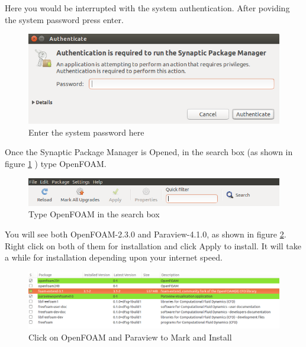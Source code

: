 \documentclass[a4paper,12pt]{report}
\begin{document}
 \flushleft Here you would be interrupted with the system authentication. After poviding the system password press enter.
 \vspace{5cm}
 \begin{figure}[h]  
\begin{center}  
\includegraphics[scale=0.4]{3.png}
\caption{Enter the system password here}
\end{center}  
\end{figure}


\flushleft Once the Synaptic Package Manager is Opened, in the search box (as shown in figure \ref{4} ) type OpenFOAM.

\begin{figure}[ht]  
\begin{center}  
\includegraphics[scale=0.4]{4.png}
\caption{Type OpenFOAM in the search box}
\label{4}
\end{center}  
\end{figure}

\flushleft You will see both OpenFOAM-2.3.0 and Paraview-4.1.0, as shown in figure \ref{5}. Right click on both of them for installation and click Apply to install. It will take a while for installation depending upon your internet speed.

\begin{figure}[ht]  
\begin{center}  
\includegraphics[scale=0.33]{5.png}
\caption{Click on OpenFOAM and Paraview to Mark and Install}
\label{5}
\end{center}  
\end{figure}
\end{document}
